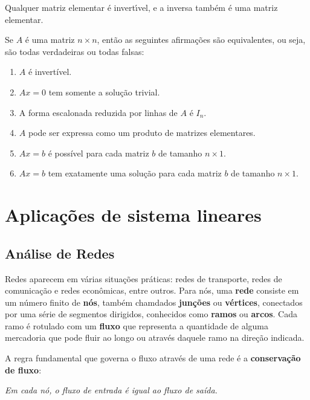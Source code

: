 \begin{teorema}
    Qualquer matriz elementar \'e invert{\'\i}vel, e a inversa tamb\'em \'e uma matriz elementar.
\end{teorema}

\begin{teorema}
    Se $A$ é uma matriz $n \times n$, então as seguintes afirmações são equivalentes, ou seja, são todas verdadeiras ou todas falsas:
    \begin{enumerate}[label={\roman*})]
        \item $A$ é invertível.
        \item $Ax = 0$ tem somente a solução trivial.
        \item A forma escalonada reduzida por linhas de $A$ é $I_n$.
        \item $A$ pode ser expressa como um produto de matrizes elementares.
        \item $Ax = b$ é possível para cada matriz $b$ de tamanho $n \times 1$.
        \item $Ax = b$ tem exatamente uma solução para cada matriz $b$ de tamanho $n \times 1$.
    \end{enumerate}
\end{teorema}

\section{Aplicações de sistema lineares}

\subsection{Análise de Redes}

Redes aparecem em várias situações práticas: redes de transporte, redes de comunicação e redes econômicas, entre outros. Para nós, uma \textbf{rede} consiste em um número finito de \textbf{nós}, também chamdados \textbf{junções} ou \textbf{vértices}, conectados por uma série de segmentos dirigidos, conhecidos como \textbf{ramos} ou \textbf{arcos}. Cada ramo é rotulado com um \textbf{fluxo} que representa a quantidade de alguma mercadoria  que pode fluir ao longo ou através daquele ramo na direção indicada.

A regra fundamental que governa o fluxo através de uma rede é a \textbf{conservação de fluxo}:

\begin{definicao}
  \textit{Em cada nó, o fluxo de entrada é igual ao fluxo de saída.}
\end{definicao}

